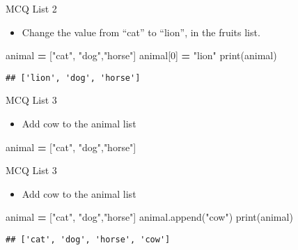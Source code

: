 \documentclass[
  8pt,
  ignorenonframetext,
]{beamer}
\newenvironment{Shaded}{\begin{snugshade}}{\end{snugshade}}
\newcommand{\BuiltInTok}[1]{#1}
\newcommand{\DecValTok}[1]{\textcolor[rgb]{0.00,0.00,0.81}{#1}}
\newcommand{\NormalTok}[1]{#1}
\newcommand{\OperatorTok}[1]{\textcolor[rgb]{0.81,0.36,0.00}{\textbf{#1}}}
\newcommand{\StringTok}[1]{\textcolor[rgb]{0.31,0.60,0.02}{#1}}
\providecommand{\tightlist}{%
  \setlength{\itemsep}{0pt}\setlength{\parskip}{0pt}}
\begin{document}
\begin{frame}[fragile]{MCQ List 2}
\protect\hypertarget{mcq-list-2-1}{}
\begin{itemize}
\tightlist
\item
  Change the value from ``cat'' to ``lion'', in the fruits list.
\end{itemize}

\begin{Shaded}
\begin{Highlighting}[]
\NormalTok{animal }\OperatorTok{=}\NormalTok{ [}\StringTok{"cat"}\NormalTok{, }\StringTok{"dog"}\NormalTok{,}\StringTok{"horse"}\NormalTok{]}
\NormalTok{animal[}\DecValTok{0}\NormalTok{] }\OperatorTok{=} \StringTok{"lion"}
\BuiltInTok{print}\NormalTok{(animal)}
\end{Highlighting}
\end{Shaded}

\begin{verbatim}
## ['lion', 'dog', 'horse']
\end{verbatim}
\end{frame}

\begin{frame}[fragile]{MCQ List 3}
\protect\hypertarget{mcq-list-3}{}
\begin{itemize}
\tightlist
\item
  Add cow to the animal list
\end{itemize}

\begin{Shaded}
\begin{Highlighting}[]
\NormalTok{animal }\OperatorTok{=}\NormalTok{ [}\StringTok{"cat"}\NormalTok{, }\StringTok{"dog"}\NormalTok{,}\StringTok{"horse"}\NormalTok{]}
\end{Highlighting}
\end{Shaded}
\end{frame}

\begin{frame}[fragile]{MCQ List 3}
\protect\hypertarget{mcq-list-3-1}{}
\begin{itemize}
\tightlist
\item
  Add cow to the animal list
\end{itemize}

\begin{Shaded}
\begin{Highlighting}[]
\NormalTok{animal }\OperatorTok{=}\NormalTok{ [}\StringTok{"cat"}\NormalTok{, }\StringTok{"dog"}\NormalTok{,}\StringTok{"horse"}\NormalTok{]}
\NormalTok{animal.append(}\StringTok{"cow"}\NormalTok{)}
\BuiltInTok{print}\NormalTok{(animal)}
\end{Highlighting}
\end{Shaded}

\begin{verbatim}
## ['cat', 'dog', 'horse', 'cow']
\end{verbatim}
\end{frame}
\end{document}
